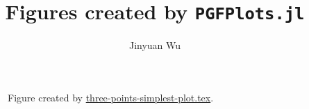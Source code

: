 \documentclass{article}
\title{Figures created by \texttt{PGFPlots.jl}}
\author{Jinyuan Wu}
\begin{document}
\maketitle

\begin{figure}
    \centering
    
    \caption{Figure created by \href{three-points-simplest-plot.tex}{three-points-simplest-plot.tex}. }
\end{figure}
\end{document}
